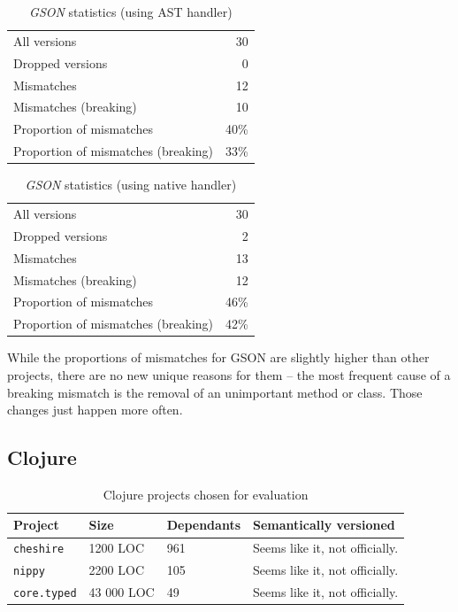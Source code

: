 \documentclass{l4proj}
\newcommand\genericstyle{\lstset{basicstyle=\ttm}}
\newcommand\codeinline[1]{{\genericstyle\lstinline!#1!}}
\begin{document}
\noindent
\begin{minipage}[t]{0.5\textwidth}
\begin{table}[H]
\centering
\begin{tabular}{|lr|}
All versions & 30 \\
Dropped versions & 0 \\
Mismatches & 12 \\
Mismatches (breaking) & 10 \\
Proportion of mismatches & 40\% \\
Proportion of mismatches (breaking) & 33\% \\
\end{tabular}
\caption{\textit{GSON} statistics (using AST handler)}
\label{GSONASTStatistics}
\end{table}
\end{minipage}
\begin{minipage}[t]{0.5\textwidth}
\begin{table}[H]
\centering
\begin{tabular}{|lr|}
All versions & 30 \\
Dropped versions & 2 \\
Mismatches & 13 \\
Mismatches (breaking) & 12 \\
Proportion of mismatches & 46\% \\
Proportion of mismatches (breaking) & 42\% \\
\end{tabular}
\caption{\textit{GSON} statistics (using native handler)}
\label{GSONNativeStatistics}
\end{table}
\end{minipage}

While the proportions of mismatches for GSON are slightly higher than
other projects, there are no new unique reasons for them -- the most
frequent cause of a breaking mismatch is the removal of an unimportant
method or class. Those changes just happen more often.

\subsection{Clojure}

\begin{table}[H]
\centering
\caption{Clojure projects chosen for evaluation}
\label{ClojureProjectsForEvaluation}
\begin{tabular}{|l|l|l|p{10cm}|}
\hline
\textbf{Project} & \textbf{Size} & \textbf{Dependants} & \textbf{Semantically versioned} \\
\hline
\codeinline{cheshire} & 1200 LOC & 961 & Seems like it, not
officially. \\
\codeinline{nippy} & 2200 LOC & 105 & Seems like it, not officially. \\
\hline
\codeinline{core.typed} & 43 000 LOC & 49 & Seems like it, not
officially. \\
\hline
\end{tabular}
\end{table}
\end{document}

